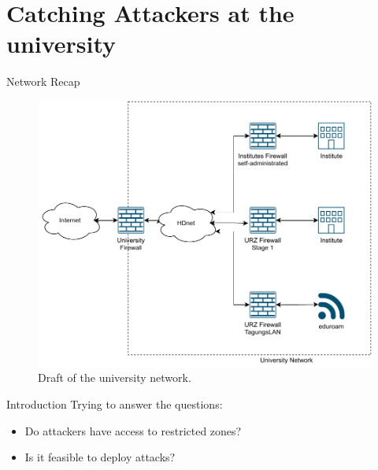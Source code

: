 \section{Catching Attackers at the university}

\begin{frame}{Network Recap}
    \begin{figure}
        \centering
        \includegraphics[width=0.8\columnwidth]{img/university-network.pdf}
        \caption[Draft of the university network]{
            Draft of the university network.
        }
    \end{figure}
\end{frame}

\begin{frame}{Introduction}
    Trying to answer the questions:
    \begin{itemize}
        \item Do attackers have access to restricted zones?
        \item Is it feasible to deploy attacks?
    \end{itemize}
\end{frame}

